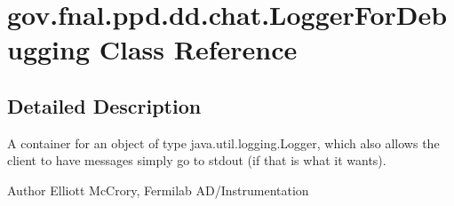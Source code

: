 \hypertarget{classgov_1_1fnal_1_1ppd_1_1dd_1_1chat_1_1LoggerForDebugging}{\section{gov.\-fnal.\-ppd.\-dd.\-chat.\-Logger\-For\-Debugging Class Reference}
\label{classgov_1_1fnal_1_1ppd_1_1dd_1_1chat_1_1LoggerForDebugging}
}


\subsection{Detailed Description}
A container for an object of type java.\-util.\-logging.\-Logger, which also allows the client to have messages simply go to stdout (if that is what it wants).

\begin{DoxyAuthor}{Author}
Elliott Mc\-Crory, Fermilab A\-D/\-Instrumentation 
\end{DoxyAuthor}
